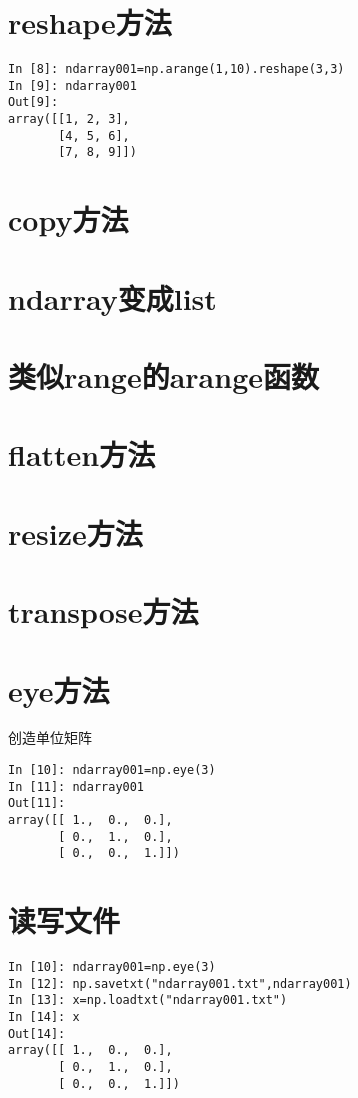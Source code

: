 \documentclass[12pt,oneside]{book}
\begin{document}
\begin{common-format}
\section{reshape方法}
\begin{Verbatim}
In [8]: ndarray001=np.arange(1,10).reshape(3,3)
In [9]: ndarray001
Out[9]: 
array([[1, 2, 3],
       [4, 5, 6],
       [7, 8, 9]])
\end{Verbatim}




\section{copy方法}



\section{ndarray变成list}


\section{类似range的arange函数}

\section{flatten方法}


\section{resize方法}


\section{transpose方法}


\section{eye方法}
创造单位矩阵

\begin{Verbatim}
In [10]: ndarray001=np.eye(3)
In [11]: ndarray001
Out[11]: 
array([[ 1.,  0.,  0.],
       [ 0.,  1.,  0.],
       [ 0.,  0.,  1.]])

\end{Verbatim}


\section{读写文件}
\begin{Verbatim}
In [10]: ndarray001=np.eye(3)
In [12]: np.savetxt("ndarray001.txt",ndarray001)
In [13]: x=np.loadtxt("ndarray001.txt")
In [14]: x
Out[14]: 
array([[ 1.,  0.,  0.],
       [ 0.,  1.,  0.],
       [ 0.,  0.,  1.]])
\end{Verbatim}



\end{common-format}
\end{document}

